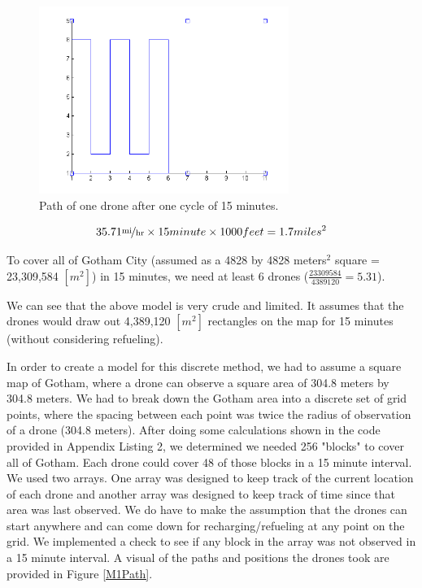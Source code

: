 \documentclass{article}
\begin{document}
\begin{figure}[htb!]
\begin{center}
\includegraphics[width=3.2in]{M1Path1.png}
\end{center}
\caption{Path of one drone after one cycle of 15 minutes.
\label{M1Path1}}
\end{figure}

\begin{equation}
35.71 \unitfrac{mi}{hr} \times 15 minute \times 1000 feet = 1.7 miles^2
\end{equation}

To cover all of Gotham City (assumed as a 4828 by 4828 meters$^{2}$ square = 23,309,584 $[m^{2}]$) in 15 minutes, we need at least 6 drones ($\frac{23309584}{4389120} = 5.31$). 

We can see that the above model is very crude and limited. It assumes that the drones would draw out 4,389,120 $[m^{2}]$ rectangles on the map for 15 minutes (without considering refueling). 

In order to create a model for this discrete method, we had to assume a square map of Gotham, where a drone can observe a square area of 304.8 meters by 304.8 meters. We had to break down the Gotham area into a discrete set of grid points, where the spacing between each point was twice the radius of observation of a drone (304.8 meters). After doing some calculations shown in the code provided in Appendix Listing 2, we determined we needed 256 "blocks" to cover all of Gotham. Each drone could cover 48 of those blocks in a 15 minute interval. We used two arrays. One array was designed to keep track of the current location of each drone and another array was designed to keep track of time since that area was last observed. We do have to make the assumption that the drones can start anywhere and can come down for recharging/refueling at any point on the grid. We implemented a check to see if any block in the array was not observed in a 15 minute interval. A visual of the paths and positions the drones took are provided in Figure \ref{M1Path}.
\end{document}
